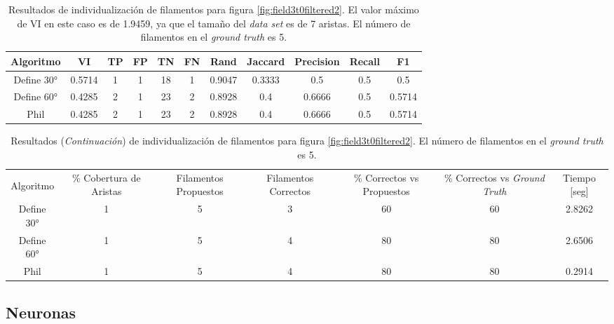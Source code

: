 \begin{table}[h]
    \centering
    \begin{tabular}{|c|c|c|c|c|c|c|c|c|c|c|}
    \hline
        Algoritmo & VI & TP & FP &TN &FN & Rand	& Jaccard &	Precision &	Recall &	F1 \\ \hline
        Define 30° & 0.5714 & 1 & 1 & 18 & 1 & 0.9047 & 0.3333 & 0.5      & 0.5 & 0.5\\
        Define 60° & 0.4285 & 2 & 1 & 23 & 2 & 0.8928 & 0.4 & 0.6666 & 0.5 & 0.5714\\ 
        Phil & 0.4285  & 2 & 1 & 23 & 2 & 0.8928 & 0.4 & 0.6666 & 0.5 & 0.5714\\
        \hline
    \end{tabular}
    \caption{Resultados de individualizaci\'on de filamentos para figura \ref{fig:field3t0filtered2}. El valor m\'aximo de VI en este caso es de 1.9459, ya que el tama\~no del {\it data set} es de 7 aristas. El n\'umero de filamentos en el {\it ground truth} es 5.}
\end{table}
\addtocounter{table}{-1}
\begin{table}[h]
    \centering
    \begin{tabular}{|c|c|c|c|c|c|c|}
    \hline
         & \multirow{4}{2cm}{\centering \% Cobertura de Aristas} & \multirow{4}{2cm}{Filamentos Propuestos} & \multirow{4}{2cm}{Filamentos Correctos} & \multirow{4}{2.5cm}{\% Correctos vs Propuestos} & \multirow{4}{2.5cm}{\centering \% Correctos vs {\it Ground Truth}} & \multirow{4}{1.2cm}{\centering Tiempo [seg]} \\
         &  &  &  & & &  \\
        Algoritmo &  &  &  & & &  \\
        &  &  &  & & &  \\ \hline
        Define 30° & 1 & 5 & 3 & 60 & 60 & 2.8262\\
        Define 60° & 1 & 5 & 4 & 80 & 80 & 2.6506\\ 
        Phil & 1 & 5 & 4 & 80 & 80 & 0.2914\\
        \hline
    \end{tabular}
    \caption{Resultados ({\it Continuaci\'on}) de individualizaci\'on de filamentos para figura \ref{fig:field3t0filtered2}. El n\'umero de filamentos en el {\it ground truth} es 5.}
\end{table}

\subsection{Neuronas}